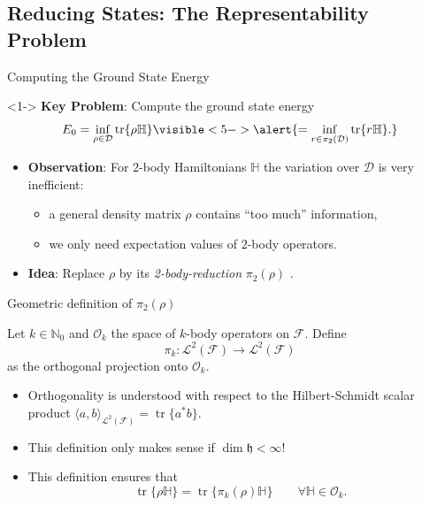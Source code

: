 \documentclass{beamer}
\DeclareMathOperator{\tr}{tr}
\newcommand{\IN}{\ensuremath{\mathbb{N}}}
\newcommand{\HS}{{\mathcal{L}^2(\FockSpace)}}
\newcommand{\HilbertSpace}{\ensuremath{\mathfrak{h}}}
\newcommand{\FockSpace}{\mathcal{F}}
\newcommand{\Hamiltonian}{\mathbb{H}}
\newcommand{\DensityMatrices}{\mathcal{D}}
\newcommand{\kbOp}[1][k]{{\ensuremath{\mathcal{O}_{#1}}}}
\newcommand{\PkbOp}[1][k]{{\ensuremath{\pi_{#1}}}}
\begin{document}
\subsection{Reducing States: The Representability Problem}
\begin{frame}{Computing the Ground State Energy}
    \begin{block}{}<1->
        \textbf{Key Problem}: Compute the ground state energy
        \begin{equation}
            \label{GSE}
            E_0=\inf_{\rho\in\DensityMatrices}\tr\{\rho\Hamiltonian\}
            \visible<5->{
              \alert{=\inf_{r\in\pi_2(\DensityMatrices)}\tr\{r\Hamiltonian\}.}
            }
        \end{equation}
    \end{block}
    \begin{itemize}
        \item<2-> \textbf{Observation}: For $2$-body Hamiltonians $\Hamiltonian$ the variation over
        $\DensityMatrices$ is very inefficient:
        \begin{itemize}
            \item<3-> a general density matrix $\rho$ contains ``too much'' information,
            \item<3-> we only need expectation values of $2$-body operators.
        \end{itemize}
      \item<4-> \textbf{Idea}: Replace $\rho$ by its \emph{2-body-reduction} $\PkbOp[2](\rho)$ \parencite{Husimi1940}.
    \end{itemize}
\end{frame}

\begin{frame}{Geometric definition of $\PkbOp[2](\rho)$}
    \begin{definition}
      Let $k\in\IN_0$ and $\kbOp$ the space of $k$-body operators on $\FockSpace$. Define
      \begin{equation}
        \PkbOp:\HS\to\HS
      \end{equation}
      as the orthogonal projection onto $\kbOp$.
    \end{definition}
    \begin{itemize}
      \item Orthogonality is understood with respect to the Hilbert-Schmidt
        scalar product $\langle a,b\rangle_{\HS}=\tr\{a^*b\}$.
      \item This definition only makes sense if $\dim\HilbertSpace<\infty$!
      \item This definition ensures that
        \begin{equation}
          \tr\{\rho\Hamiltonian\}=\tr\{\PkbOp(\rho)\Hamiltonian\}
          \qquad\forall\Hamiltonian\in\kbOp.
        \end{equation}
    \end{itemize}
\end{frame}
\end{document}
